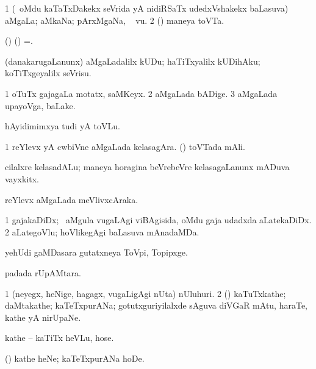 \bentry
{} 
\gl{\nA}
\bmng
\bnum
\num{1} (\kanmu\ oMdu kaTaTxDakekx seVrida yA nidiRSaTx udedxVshakekx baLasuva) aMgaLa; aMkaNa; pArxMgaNa, \udA\  \mo vu. 
\num{2} (\ame) maneya toVTa.
\enum
\emng

\noindent
\gl{\pagu} 
\bmng
{} (\birx) (\AmA) =.
\emng 
\eentry

\bentry
{} 
\gl{\sakirx} 
\bmng
(danakarugaLanunx) aMgaLadalilx kUDu;  haTiTxyalilx kUDihAku; koTiTxgeyalilx seVrisu.
\emng
\eentry

\bentry
{} 
\gl{\nA} 
\bmng
\bnum
\num{1} oTuTx gajagaLa motatx, saMKeyx.
\num{2} aMgaLada bADige. 
\num{3} aMgaLada upayoVga, baLake.
\enum
\emng 
\eentry

\bentry
{} 
\gl{\nA} 
\bmng
hAyidimimxya tudi yA toVLu.
\emng 
\eentry

\bentry
{} 
\gl{\nA} 
\bmng
\bnum
\num{1} reYlevx yA cwbiVne  aMgaLada kelasagAra. 
 (\ame) 
\banum
{} toVTada mAli. 

 cilalxre kelasadALu; maneya horagina beVrebeVre kelasagaLanunx mADuva vayxkitx.
\eanum
\numie
\enum
\emng
\eentry

\bentry
{} 
\gl{\nA} 
\bmng
reYlevx aMgaLada meVlivxcAraka.
\emng 
\eentry

\bentry
{} 
\gl{\nA}
\bmng
\bnum
\num{1} gajakaDiDx; \sA\ aMgula \mo vugaLAgi viBAgisida, oMdu gaja udadxda aLatekaDiDx. 
\num{2} aLategoVlu; hoVlikegAgi baLasuva mAnadaMDa.
\enum
\emng
\eentry

\bentry
{} 
\gl{\nA} 
\bmng
yehUdi gaMDasara gutatxneya ToVpi, Topipxge.
\emng
\eentry

\bentry
{} 
\gl{\nA} 
\bmng
{} padada rUpAMtara.
\emng
\eentry

\bentry
{} 
\gl{\nA} 
\bmng
\bnum
\num{1} (neyegx, heNige, hagagx, \mo vugaLigAgi nUta) nUluhuri. 
\num{2} (\AmA) kaTuTxkathe; daMtakathe; kaTeTxpurANa; gotutxguriyilalxde sAguva diVGaR mAtu, haraTe, kathe yA nirUpaNe.
\enum
\emng

\noindent
\gl{\pagu} 
\bmng
{} kathe -- kaTiTx heVLu, hose.
\emng
\eentry


\bentry
{} 
\gl{\akirx}
\bmng
(\AmA) kathe heNe; kaTeTxpurANa hoDe.
\emng
\eentry


